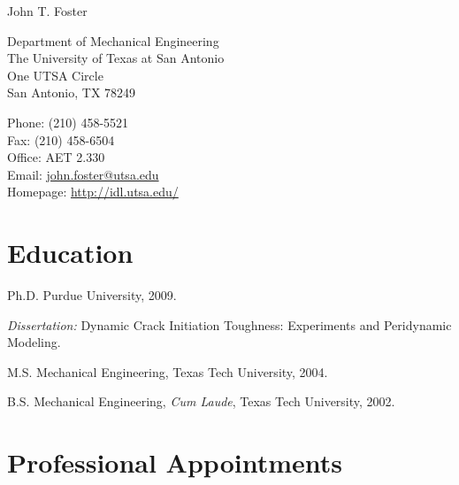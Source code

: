 \documentclass[12pt,letterpaper]{article}
\makeatletter
\let\saved@bibitem\@bibitem %
\def\name{John T. Foster}
\renewenvironment{itemize}{
  \begin{list}{}{
    \setlength{\leftmargin}{1.5em}
    \setlength{\itemsep}{0.25em}
    \setlength{\parskip}{0pt}
    \setlength{\parsep}{0.25em}
  }
}{
  \end{list}
}
\makeatother
\begin{document}
\sloppy

\begingroup
\makeatletter
\let\@bibitem\saved@bibitem %
\endgroup


{\huge \name}


\bigskip

\begin{minipage}[t]{0.5\textwidth}
  Department of Mechanical Engineering \\
  The University of Texas at San Antonio \\
  One UTSA Circle \\
  San Antonio, TX 78249
\end{minipage}
\begin{minipage}[t]{0.5\textwidth}
  Phone: (210) 458-5521 \\
  Fax: (210) 458-6504 \\
  Office: AET 2.330 \\
  Email: \href{mailto:john.foster@utsa.edu}{john.foster@utsa.edu} \\
  Homepage: \href{http://idl.utsa.edu/}{http://idl.utsa.edu/}
\end{minipage}

\section*{Education}

\begin{itemize}
  \item Ph.D. Purdue University, 2009.
    \begin{itemize}
    \item \textit{Dissertation:}
      Dynamic Crack Initiation Toughness: Experiments and Peridynamic Modeling.
    \end{itemize}
  \item M.S. Mechanical Engineering, Texas Tech University, 2004.
  \item B.S. Mechanical Engineering, \textit{Cum Laude},
   Texas Tech University, 2002.
\end{itemize}

\section*{Professional Appointments}
\end{document}
